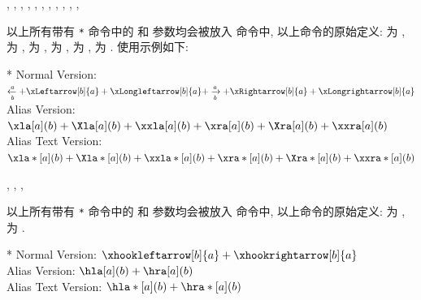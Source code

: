 \begin{function}[updated=2024-12-05]{\xla, \xla*, \Xla, \Xla*, \xxla, \xxla*, \xra, \xra*, \Xra, \Xra*, \xxra, \xxra*}
  \begin{syntax}
  \end{syntax}
  以上所有带有 \texttt{*} 命令中的  和  参数均会被放入 \cmd{\text} 命令中, 以上命令的原始定义: \cmd{\xla} 为 , 
  \cmd{\Xla} 为 , \cmd{\xxla} 为 , \cmd{\xra} 为 , \cmd{\Xra} 为 ,
  \cmd{\xxra} 为 . 
  使用示例如下:
\end{function}
\begin{DocExample}*
Normal Version: $\xleftarrow[b]{a} + \xLeftarrow[b]{a} + \xLongleftarrow[b]{a} + \xrightarrow[b]{a} + \xRightarrow[b]{a} + \xLongrightarrow[b]{a}$ \\ 
Alias Version: $\xla[a](b) + \Xla[a](b) + \xxla[a](b) + \xra[a](b) + \Xra[a](b) + \xxra[a](b)$ \\
Alias Text Version: $\xla*[a](b) + \Xla*[a](b) + \xxla*[a](b) + \xra*[a](b) + \Xra*[a](b) + \xxra*[a](b)$
\end{DocExample}


\begin{function}[updated=2024-12-05]{\hla, \hla*, \hra, \hra*}
  \begin{syntax}
  \end{syntax}
  以上所有带有 \texttt{*} 命令中的  和  参数均会被放入 \cmd{\text} 命令中, 以上命令的原始定义: \cmd{\hla} 为 , 
  \cmd{\hra} 为 .
\end{function}
\begin{DocExample}*
Normal Version: $\xhookleftarrow[b]{a} + \xhookrightarrow[b]{a}$ \\
Alias Version: $\hla[a](b) + \hra[a](b)$ \\
Alias Text Version: $\hla*[a](b) + \hra*[a](b)$
\end{DocExample}



